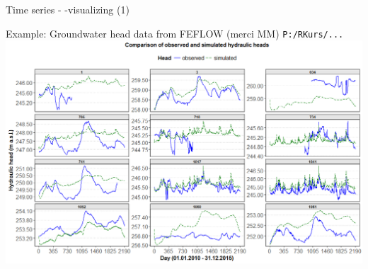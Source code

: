 \documentclass[9pt,ignorenonframetext,]{beamer}
\begin{document}
\begin{frame}[fragile]{Time series - -visualizing (1)}

Example: Groundwater head data from FEFLOW (merci MM)
\texttt{P:/RKurs/...}
\includegraphics{imgPres/time_series_head_analysis01.png}

\end{frame}
\end{document}
